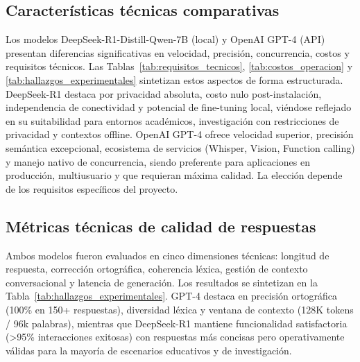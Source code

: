 \documentclass[12pt,a4paper]{report}
\numberwithin{figure}{section}
\begin{document}
\vspace{1em}

\subsection[Características técnicas comparativas]{Características técnicas comparativas}
\label{subsec:caracteristicas_tecnicas}

Los modelos DeepSeek-R1-Distill-Qwen-7B (local) y OpenAI GPT-4 (API) presentan diferencias significativas en velocidad, precisión, concurrencia, costos y requisitos técnicos. Las Tablas~\ref{tab:requisitos_tecnicos}, \ref{tab:costos_operacion} y \ref{tab:hallazgos_experimentales} sintetizan estos aspectos de forma estructurada. DeepSeek-R1 destaca por privacidad absoluta, costo nulo post-instalación, independencia de conectividad y potencial de fine-tuning local, viéndose reflejado en su suitabilidad para entornos académicos, investigación con restricciones de privacidad y contextos offline. OpenAI GPT-4 ofrece velocidad superior, precisión semántica excepcional, ecosistema de servicios (Whisper, Vision, Function calling) y manejo nativo de concurrencia, siendo preferente para aplicaciones en producción, multiusuario y que requieran máxima calidad. La elección depende de los requisitos específicos del proyecto.

\vspace{1em}

\subsection{Métricas técnicas de calidad de respuestas}
\label{subsec:metricas_calidad}

Ambos modelos fueron evaluados en cinco dimensiones técnicas: longitud de respuesta, corrección ortográfica, coherencia léxica, gestión de contexto conversacional y latencia de generación. Los resultados se sintetizan en la Tabla~\ref{tab:hallazgos_experimentales}. GPT-4 destaca en precisión ortográfica (100\% en 150+ respuestas), diversidad léxica y ventana de contexto (128K tokens / 96k palabras), mientras que DeepSeek-R1 mantiene funcionalidad satisfactoria (>95\% interacciones exitosas) con respuestas más concisas pero operativamente válidas para la mayoría de escenarios educativos y de investigación.

\vspace{1em}
\end{document}
